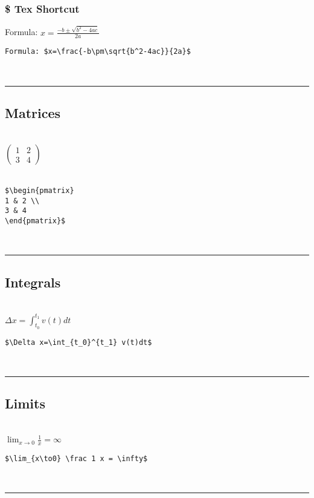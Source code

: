 \documentclass[a4paper,12pt,titlepage]{article}
\begin{document}
\subsubsection{\$ Tex Shortcut}
Formula: $x=\frac{-b\pm\sqrt{b^2-4ac}}{2a}$
\\
\begin{lstlisting}  
Formula: $x=\frac{-b\pm\sqrt{b^2-4ac}}{2a}$
\end{lstlisting}  
~\\
\rule{\linewidth}{0.1mm}





\subsection{Matrices}
~\\
$\begin{pmatrix} 
1 & 2 \\ 
3 & 4 
\end{pmatrix}$
\\
\\
\begin{lstlisting}  
$\begin{pmatrix} 
1 & 2 \\ 
3 & 4 
\end{pmatrix}$
\end{lstlisting}  
~\\
\rule{\linewidth}{0.1mm}




\subsection{Integrals}
~\\
$\Delta x=\int_{t_0}^{t_1} v(t)dt$
\\
\begin{lstlisting}  
$\Delta x=\int_{t_0}^{t_1} v(t)dt$
\end{lstlisting}  
~\\
\rule{\linewidth}{0.1mm}




\subsection{Limits}
~\\
$\lim_{x\to0} \frac 1 x = \infty$
\\
\begin{lstlisting}  
$\lim_{x\to0} \frac 1 x = \infty$
\end{lstlisting}  
~\\
\rule{\linewidth}{0.1mm}
\end{document}
